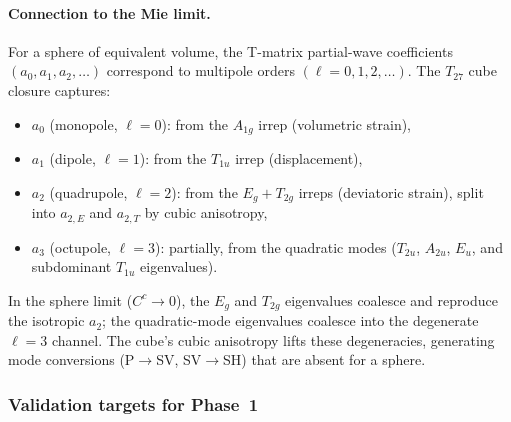 \paragraph{Connection to the Mie limit.}
For a sphere of equivalent volume, the T-matrix partial-wave
coefficients $(a_0, a_1, a_2, \ldots)$ correspond to multipole
orders $(\ell = 0, 1, 2, \ldots)$.  The $T_{27}$ cube closure captures:
\begin{itemize}
  \item $a_0$ (monopole, $\ell = 0$): from the $A_{1g}$ irrep
    (volumetric strain),
  \item $a_1$ (dipole, $\ell = 1$): from the $T_{1u}$ irrep
    (displacement),
  \item $a_2$ (quadrupole, $\ell = 2$): from the $E_g + T_{2g}$
    irreps (deviatoric strain), split into $a_{2,E}$ and $a_{2,T}$ by
    cubic anisotropy,
  \item $a_3$ (octupole, $\ell = 3$): partially, from the quadratic
    modes ($T_{2u}$, $A_{2u}$, $E_u$, and subdominant $T_{1u}$
    eigenvalues).
\end{itemize}
In the sphere limit ($C^c \to 0$), the $E_g$ and $T_{2g}$ eigenvalues
coalesce and reproduce the isotropic $a_2$; the quadratic-mode
eigenvalues coalesce into the degenerate $\ell = 3$ channel.  The cube's
cubic anisotropy lifts these degeneracies, generating mode conversions
(P$\to$SV, SV$\to$SH) that are absent for a sphere.

\subsubsection{Validation targets for Phase~1}
\label{sec:validation-targets}

